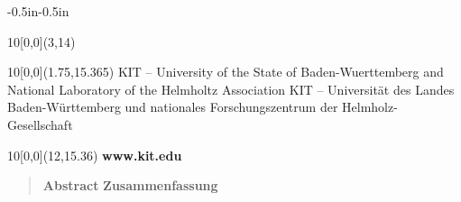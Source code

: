 \begin{titlepage}
\begin{adjustwidth}{-0.5in}{-0.5in}
\begin{textblock}{10}[0,0](3,14)
\begin{center}
\large{\term}
\end{center}
\end{textblock}

\begin{textblock}{10}[0,0](1.75,15.365)
\tiny{ 
		{KIT -- University of the State of Baden-Wuerttemberg and National Laboratory of the Helmholtz Association}
		{KIT -- Universität des Landes Baden-Württemberg und nationales Forschungszentrum der Helmholz-Gesellschaft}
}
\end{textblock}

\begin{textblock}{10}[0,0](12,15.36)
\large{
	\textbf{www.kit.edu} 
}
\end{textblock}
\end{adjustwidth}
\end{titlepage}




\hfill
\thispagestyle{empty}
\newpage

\pagestyle{scrheadings}
\ohead{\pagemark} 
\chead{}
\ihead{\mytitle} 
\ifoot{\myname}
\cfoot{}

\setcounter{page}{1}

\newpage
\thispagestyle{scrheadings}
\begin{abstract}\hfill \newline
{}
		{\textbf{Abstract}}
		{\textbf{Zusammenfassung}} \\
\myabstract
\end{abstract}

\newpage